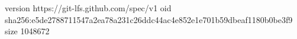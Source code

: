 version https://git-lfs.github.com/spec/v1
oid sha256:e5de2788711547a2ea78a231c26ddc44ac4e852e1e701b59dbeaf1180b0be3f9
size 1048672
